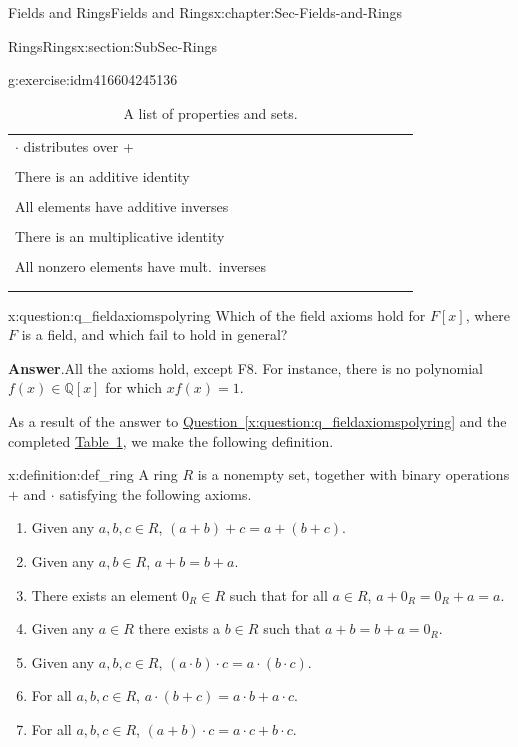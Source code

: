\documentclass[oneside,10pt,]{book}
\numberwithin{equation}{section}
\newcommand{\hrulethin}  {\noalign{\hrule height 0.04em}}
\def\Q{{\mathbb Q}}
\begin{document}
\begin{chapterptx}{Fields and Rings}{}{Fields and Rings}{}{}{x:chapter:Sec-Fields-and-Rings}
\begin{sectionptx}{Rings}{}{Rings}{}{}{x:section:SubSec-Rings}
\begin{inlineexercise}{}{g:exercise:idm416604245136}
\begin{table}
\begin{tabular}{lllllllllll}
\(\cdot\) distributes over +&&&&&&&&&&\tabularnewline[0pt]
&&&&&&&&&&\tabularnewline\hrulethin
There is an additive identity&&&&&&&&&&\tabularnewline[0pt]
&&&&&&&&&&\tabularnewline\hrulethin
All elements have additive inverses&&&&&&&&&&\tabularnewline[0pt]
&&&&&&&&&&\tabularnewline\hrulethin
There is an multiplicative identity&&&&&&&&&&\tabularnewline[0pt]
&&&&&&&&&&\tabularnewline\hrulethin
All nonzero elements have mult.~inverses&&&&&&&&&&\tabularnewline[0pt]
&&&&&&&&&&\tabularnewline\hrulethin
\end{tabular}
\caption{A list of properties and sets.\label{x:table:table_propertiessandsets}}
\end{table}
\end{inlineexercise}
\begin{question}{}{x:question:q_fieldaxiomspolyring}%
Which of the field axioms hold for \(F[x]\), where \(F\) is a field, and which fail to hold in general?%
\par\smallskip%
\noindent\textbf{Answer}.\hypertarget{g:answer:idm416604144592}{}\quad{}All the axioms hold, except F8. For instance, there is no polynomial \(f(x)\in \Q[x]\) for which \(x f(x) = 1\).%
\end{question}
As a result of the answer to \hyperref[x:question:q_fieldaxiomspolyring]{Question~\ref{x:question:q_fieldaxiomspolyring}} and the completed \hyperref[x:table:table_propertiessandsets]{Table~\ref{x:table:table_propertiessandsets}}, we make the following definition.%
\begin{definition}{}{x:definition:def_ring}%
A ring \(R\) is a nonempty set, together with binary operations \(+\) and \(\cdot\) satisfying the following axioms.%
\begin{enumerate}
\item{}Given any \(a,b,c\in R\), \((a+b)+c = a+(b+c)\).%
\item{}Given any \(a,b\in R\), \(a+b= b+a\).%
\item{}There exists an element \(0_R\in R\) such that for all \(a\in R\), \(a+0_R = 0_R + a = a\)\footnotemark{}.%
\item{}Given any \(a\in R\) there exists a \(b\in R\) such that \(a+b = b + a =0_R\).%
\item{}Given any \(a,b,c\in R\), \((a\cdot b)\cdot c = a\cdot (b\cdot c)\).%
\item{}For all \(a,b,c\in R\), \(a\cdot (b+c) = a\cdot b + a\cdot c\).%
\item{}For all \(a,b,c\in R\), \((a+b)\cdot c = a\cdot c + b\cdot c\).%
\end{enumerate}

\end{definition}
\end{sectionptx}
\end{chapterptx}
\end{document}
